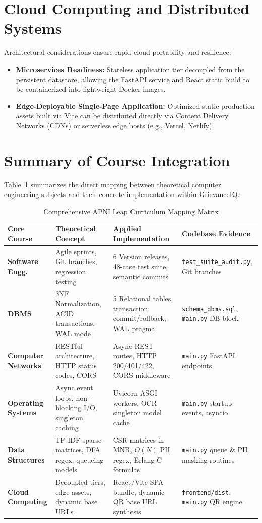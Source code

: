 \section{Cloud Computing and Distributed Systems}
Architectural considerations ensure rapid cloud portability and resilience:
\begin{itemize}
    \item \textbf{Microservices Readiness:} Stateless application tier decoupled from the persistent datastore, allowing the FastAPI service and React static build to be containerized into lightweight Docker images.
    \item \textbf{Edge-Deployable Single-Page Application:} Optimized static production assets built via Vite can be distributed directly via Content Delivery Networks (CDNs) or serverless edge hosts (e.g., Vercel, Netlify).
\end{itemize}

\section{Summary of Course Integration}
Table~\ref{tab:apni_leap_mapping} summarizes the direct mapping between theoretical computer engineering subjects and their concrete implementation within GrievanceIQ.

\begin{table}[h]
\centering
\caption{Comprehensive APNI Leap Curriculum Mapping Matrix}
\label{tab:apni_leap_mapping}
\begin{tabular}{|p{3.2cm}|p{4.2cm}|p{4.2cm}|p{3.4cm}|}
\hline
\textbf{Core Course} & \textbf{Theoretical Concept} & \textbf{Applied Implementation} & \textbf{Codebase Evidence} \\ \hline
\textbf{Software Engg.} & Agile sprints, Git branches, regression testing & 6 Version releases, 48-case test suite, semantic commits & \texttt{test\_suite\_audit.py}, Git branches \\ \hline
\textbf{DBMS} & 3NF Normalization, ACID transactions, WAL mode & 5 Relational tables, transaction commit/rollback, WAL pragma & \texttt{schema\_dbms.sql}, \texttt{main.py} DB block \\ \hline
\textbf{Computer Networks} & RESTful architecture, HTTP status codes, CORS & Async REST routes, HTTP 200/401/422, CORS middleware & \texttt{main.py} FastAPI endpoints \\ \hline
\textbf{Operating Systems} & Async event loops, non-blocking I/O, singleton caching & Uvicorn ASGI workers, OCR singleton model cache & \texttt{main.py} startup events, asyncio \\ \hline
\textbf{Data Structures} & TF-IDF sparse matrices, DFA regex, queueing models & CSR matrices in MNB, $O(N)$ PII regex, Erlang-C formulas & \texttt{main.py} queue \& PII masking routines \\ \hline
\textbf{Cloud Computing} & Decoupled tiers, edge assets, dynamic base URLs & React/Vite SPA bundle, dynamic QR base URL synthesis & \texttt{frontend/dist}, \texttt{main.py} QR engine \\ \hline
\end{tabular}
\end{table}
